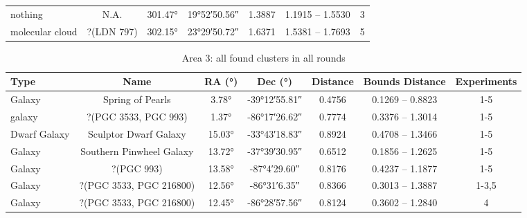 \begin{table}[H]
\begin{tabular}{l c c c c c c }
        nothing                                        & N.A.                & \ang{301.47} & \ang{+19;52;50.56} & 1.3887   & 1.1915 -- 1.5530 & 3           \\ %
        molecular cloud                                & ?(LDN 797)          & \ang{302.15} & \ang{+23;29;50.72} & 1.6371   & 1.5381 -- 1.7693 & 5           \\ %
        \bottomrule
    \end{tabular}
\end{table}

\begin{longtable}{l c c c c c c}
    \caption{Area 3: all found clusters in all rounds} \label{tb:results-raw-a3}                                                          \\
    \toprule
    Type                & Name                             & RA (°)      & Dec (°)            & Distance & Bounds Distance  & Experiments \\
    \midrule
    Galaxy              & Spring of Pearls                 & \ang{3.78}  & \ang{-39;12;55.81} & 0.4756   & 0.1269 -- 0.8823 & 1-5         \\ %
    galaxy              & ?(PGC 3533, PGC 993)             & \ang{1.37}  & \ang{-86;17;26.62} & 0.7774   & 0.3376 -- 1.3014 & 1-5         \\ %
    Dwarf Galaxy        & Sculptor Dwarf Galaxy            & \ang{15.03} & \ang{-33;43;18.83} & 0.8924   & 0.4708 -- 1.3466 & 1-5         \\ %
    Galaxy              & Southern Pinwheel Galaxy         & \ang{13.72} & \ang{-37;39;30.95} & 0.6512   & 0.1856 -- 1.2625 & 1-5         \\ %
    Galaxy              & ?(PGC 993)                       & \ang{13.58} & \ang{-87;4;29.60}  & 0.8176   & 0.4237 -- 1.1877 & 1-5         \\ %
    Galaxy              & ?(PGC 3533, PGC 216800)          & \ang{12.56} & \ang{-86;31;6.35}  & 0.8366   & 0.3013 -- 1.3887 & 1-3,5       \\ %
    Galaxy              & ?(PGC 3533, PGC 216800)          & \ang{12.45} & \ang{-86;28;57.56} & 0.8124   & 0.3602 -- 1.2840 & 4           \\ %

\end{longtable}
